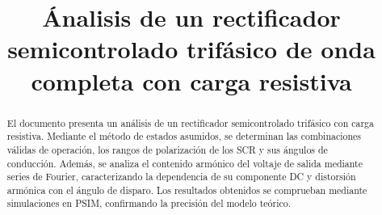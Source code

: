 \documentclass[conference]{IEEEtran}
\begin{document}
%
\title{Ánalisis de un rectificador semicontrolado trifásico de onda completa con carga resistiva}

\author{
\and
{}
\and
{}
\and
{}
}

\maketitle

\thispagestyle{firststyle}
\renewcommand{\headrulewidth}{0in}
\pagestyle{empty}


\pagestyle{fancy}
\chead{\fontsize{8}{10} \selectfont \textit{} }



\begin{abstract}
El documento presenta un análisis de un rectificador semicontrolado trifásico con carga resistiva. Mediante el método de estados asumidos, se determinan las combinaciones válidas de operación,
los rangos de polarización de los SCR y sus ángulos de conducción. Además, se analiza el contenido armónico del voltaje de salida mediante series de Fourier, caracterizando la dependencia de su
componente DC y distorsión armónica con el ángulo de disparo. Los resultados obtenidos se comprueban mediante simulaciones en PSIM, confirmando la precisión del modelo teórico.
\end{abstract}
\end{document}
